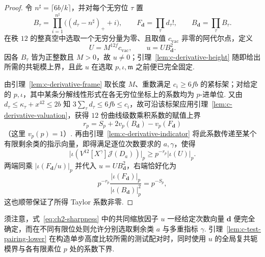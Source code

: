 \begin{proof}
令 $n^\sharp=\lceil6b/k\rceil$，并对每个无穷位 $\tau$ 置
\[
 B_\tau=\prod_{i=1}^{n^\sharp}\bigl((d_\tau-n^\sharp)_++i\bigr),
 \qquad
 F_{\boldsymbol d}=\prod_\tau d_\tau!,
 \qquad B_{\boldsymbol d}=\prod_\tau B_\tau .
\]
在秩 $12$ 的整真空中选取一个无穷分量为零、且取值 $c_{\mathrm{vac}}$ 非零的阿代尔点，定义
\[
 U=M^{12f}c_{\mathrm{vac}},\qquad u=U B_{\boldsymbol d}^2 .
\]
因各 $B_\tau$ 皆为正整数且 $M>0$，故 $u\ne0$；引理~\ref{lem:c-derivative-height} 随即给出所需的共轭模上界，且此 $u$ 在选取 $p,\iota,\mathfrak m$ 之前便已完全固定.

由引理~\ref{lem:c-derivative-frame} 取长度 $M$、重数满足 $c_i\ge6fb$ 的紧标架；对给定的 $p,\iota$，其中某条分解线性形式在各无穷位坐标上的系数均为 $p$-进单位. 又由 $d_\tau\le\kappa_\tau+x^{42}\le2b$ 知 $3\sum_\tau d_\tau\le6fb\le c_i$，故可沿该标架应用引理~\ref{lem:c-derivative-valuation}，获得 $12$ 份曲线级数乘积系数的赋值上界
\[
 r_p=S_p+2v_p(B_{\boldsymbol d})-v_p(F_{\boldsymbol d})
\]
（这里 $v_p(p)=1$）. 再由引理~\ref{lem:c-derivative-indicator} 将此系数传递至某个有限剩余类的指示向量，即得满足逐位次数要求的 $a,\gamma$，使得
\[
 \bigl|\iota(V^{12}[X^\gamma]\mathcal J(D_a))\bigr|_p
       \ge p^{-r_p}|\iota(U)|_p .
\]
两端同乘 $|\iota(F_{\boldsymbol d}/u)|_p$ 并代入 $u=U B_{\boldsymbol d}^2$，右端恰好化为
\[
 p^{-r_p}\frac{|\iota(F_{\boldsymbol d})|_p}
                     {|\iota(B_{\boldsymbol d})|_p^2}
 =p^{-S_p},
\]
这也顺带保证了所得 Taylor 系数非零.
\end{proof}

须注意，式~\eqref{eq:ch2-sharpness} 中的共同缩放因子 $u$ 一经给定次数向量 $\boldsymbol d$ 便完全确定，而在不同有限位处则允许分别选取剩余类 $a$ 与多重指标 $\gamma$. 引理~\ref{lem:c-test-pairing-lower} 在构造单步高度比较所需的测试配对时，同时使用 $u$ 的全局复共轭模界与各有限素位 $p$ 处的系数下界.
